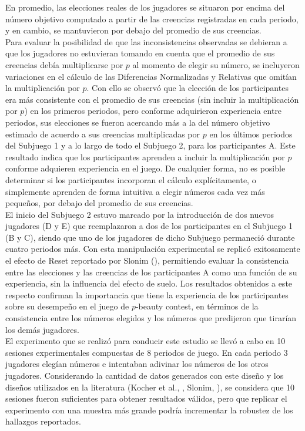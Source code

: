 En promedio, las elecciones reales de los jugadores se situaron por encima del número objetivo computado a partir de las creencias registradas en cada periodo, y en cambio, se mantuvieron por debajo del promedio de sus creencias.\\

Para evaluar la posibilidad de que las inconsistencias observadas se debieran a que los jugadores no estuvieran tomando en cuenta que el promedio de sus creencias debía multiplicarse por $p$ al momento de elegir su número, se incluyeron variaciones en el cálculo de las Diferencias Normalizadas y Relativas que omitían la multiplicación por $p$. Con ello se observó que la elección de los participantes era más consistente con el promedio de sus creencias (sin incluir la multiplicación por $p$) en los primeros periodos, pero conforme adquirieron experiencia entre periodos, sus elecciones se fueron acercando más a la del número objetivo estimado de acuerdo a sus creencias multiplicadas por $p$ en los últimos periodos del Subjuego 1 y a lo largo de todo el Subjuego 2, para los participantes A. Este resultado indica que los participantes aprenden a incluir la multiplicación por $p$ conforme adquieren experiencia en el juego. De cualquier forma, no es posible determinar si los participantes incorporan el cálculo explícitamente, o simplemente aprenden de forma intuitiva a elegir números cada vez más pequeños, por debajo del promedio de sus creencias.\\

El inicio del Subjuego 2 estuvo marcado por la introducción de dos nuevos jugadores (D y E) que reemplazaron a dos de los participantes en el Subjuego 1 (B y C), siendo que uno de los jugadores de dicho Subjuego permaneció durante cuatro periodos más. Con esta manipulación experimental se replicó exitosamente el efecto de Reset reportado por Slonim (\citeyear{Slonim}), permitiendo evaluar la consistencia entre las elecciones y las creencias de los participantes A como una función de su experiencia, sin la influencia del efecto de suelo. Los resultados obtenidos a este respecto confirman la importancia que tiene la experiencia de los participantes sobre su desempeño en el juego de $p$-beauty contest, en términos de la consistencia entre los números elegidos y los números que predijeron que tirarían los demás jugadores. \\

El experimento que se realizó para conducir este estudio se llevó a cabo en 10 sesiones experimentales compuestas de 8 periodos de juego. En cada periodo 3 jugadores elegían números e intentaban adivinar los números de los otros jugadores. Considerando la cantidad de datos generados con este diseño y los diseños utilizados en la literatura (Kocher et al., \citeyear{Kocher}, Slonim, \citeyear{Slonim}), se considera que 10 sesiones fueron suficientes para obtener resultados válidos, pero que replicar el experimento con una muestra más grande podría incrementar la robustez de los hallazgos reportados.\\

